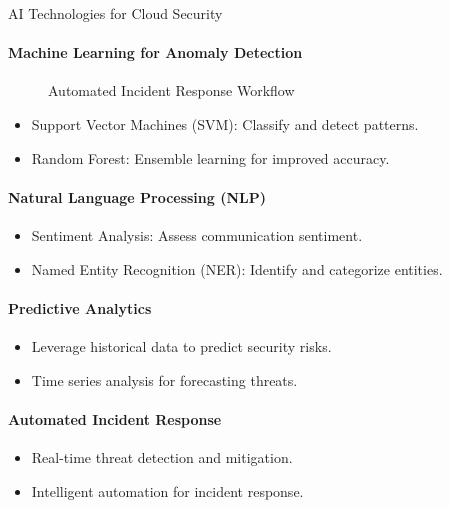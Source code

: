 \documentclass{beamer}
\begin{document}
\begin{frame}{AI Technologies for Cloud Security}
\framesubtitle{Machine Learning for Anomaly Detection}
\begin{figure}[h]
    \centering
    \caption{Automated Incident Response Workflow}
    \label{fig:automated_response}
\end{figure}


\end{frame}

\begin{frame}
 \begin{itemize}
    \item Support Vector Machines (SVM): Classify and detect patterns.
    \item Random Forest: Ensemble learning for improved accuracy.
\end{itemize}

\framesubtitle{Natural Language Processing (NLP)}
\begin{itemize}
    \item Sentiment Analysis: Assess communication sentiment.
    \item Named Entity Recognition (NER): Identify and categorize entities.
\end{itemize}

\framesubtitle{Predictive Analytics}
\begin{itemize}
    \item Leverage historical data to predict security risks.
    \item Time series analysis for forecasting threats.
\end{itemize}

\framesubtitle{Automated Incident Response}
\begin{itemize}
    \item Real-time threat detection and mitigation.
    \item Intelligent automation for incident response.
\end{itemize}
\end{frame}
    
\end{document}
